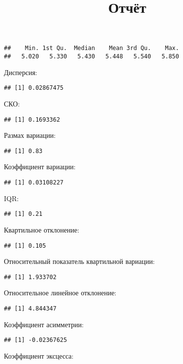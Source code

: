 \documentclass[,]{article}
\title{Отчёт}
\author{}
\date{}
\begin{document}
\maketitle

\begin{verbatim}
##    Min. 1st Qu.  Median    Mean 3rd Qu.    Max. 
##   5.020   5.330   5.430   5.448   5.540   5.850
\end{verbatim}

Дисперсия:

\begin{verbatim}
## [1] 0.02867475
\end{verbatim}

СКО:

\begin{verbatim}
## [1] 0.1693362
\end{verbatim}

Размах вариации:

\begin{verbatim}
## [1] 0.83
\end{verbatim}

Коэффициент вариации:

\begin{verbatim}
## [1] 0.03108227
\end{verbatim}

IQR:

\begin{verbatim}
## [1] 0.21
\end{verbatim}

Квартильное отклонение:

\begin{verbatim}
## [1] 0.105
\end{verbatim}

Относительный показатель квартильной вариации:

\begin{verbatim}
## [1] 1.933702
\end{verbatim}

Относительное линейное отклонение:

\begin{verbatim}
## [1] 4.844347
\end{verbatim}

Коэффициент асимметрии:

\begin{verbatim}
## [1] -0.02367625
\end{verbatim}

Коэффициент эксцесса:
\end{document}
